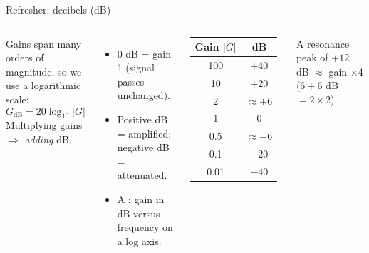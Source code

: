 \documentclass[aspectratio=169,10pt]{beamer}
\begin{document}
\begin{frame}{Refresher: decibels (dB)}
\begin{columns}[T]
\begin{defbox}
\small
Gains span many orders of magnitude, so we use a logarithmic scale:
\[
G_\text{dB}=20\log_{10}|G|
\]
Multiplying gains $\Rightarrow$ \emph{adding} dB.
\end{defbox}
\begin{itemize}\small
\item 0 dB = gain 1 (signal passes unchanged).
\item Positive dB = amplified; negative dB = attenuated.
\item A : gain in dB versus frequency on a log axis.
\end{itemize}
\centering
\renewcommand{\arraystretch}{1.2}
\small
\begin{tabular}{@{}c c@{}}
\toprule
\textbf{Gain $|G|$} & \textbf{dB}\\
\midrule
100 & $+40$\\
10 & $+20$\\
2 & $\approx +6$\\
1 & 0\\
0.5 & $\approx -6$\\
0.1 & $-20$\\
0.01 & $-40$\\
\bottomrule
\end{tabular}

\vspace{2mm}
\begin{keybox}[Example]
\small A resonance peak of $+12$ dB $\approx$ gain $\times4$ ($6+6$ dB $=2\times2$).
\end{keybox}
\end{columns}
\end{frame}
\end{document}
